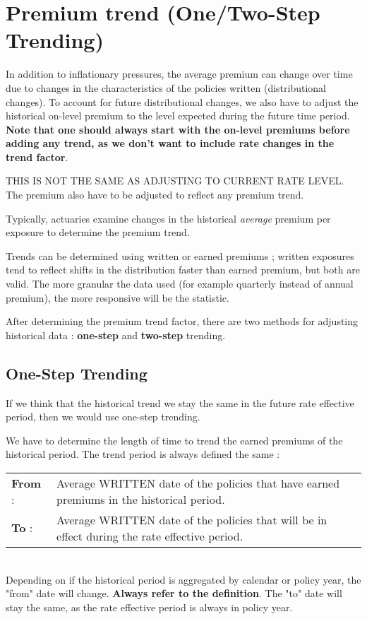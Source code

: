 \documentclass[11pt, english]{memoir}
\numberwithin{definition}{section}
\begin{document}
	\section{Premium trend (One/Two-Step Trending)}
	In addition to inflationary pressures, the average premium can change over time due to changes in the characteristics of the policies written (distributional changes). To account for future distributional changes, we also have to adjust the historical on-level premium to the level expected during the future time period. \textbf{Note that one should always start with the on-level premiums before adding any trend, as we don't want to include rate changes in the trend factor}.
	
	THIS IS NOT THE SAME AS ADJUSTING TO CURRENT RATE LEVEL. The premium also have to be adjusted to reflect any premium trend. 
	
	Typically, actuaries examine changes in the historical \emph{average} premium per exposure to determine the premium trend. 
	
	Trends can be determined using written or earned premiums ; written exposures tend to reflect shifts in the distribution faster than earned premium, but both are valid. The more granular the data used (for example quarterly instead of annual premium), the more responsive will be the statistic. 
	
	After determining the premium trend factor, there are two methods for adjusting historical data : \textbf{one-step} and \textbf{two-step} trending. 
	
	\subsection{One-Step Trending}
	If we think that the historical trend we stay the same in the future rate effective period, then we would use one-step trending. 
	
	We have to determine the length of time to trend the earned premiums of the historical period. The trend period is always defined the same : 
	
	\begin{tcolorbox}
		\begin{tabular}{ll}
			\textbf{From} : & 	\begin{minipage}{0.8\linewidth}
				Average WRITTEN date of the policies that have earned premiums in the historical period.
			\end{minipage}\\[15pt]
			\textbf{To} : & \begin{minipage}{0.8\linewidth}
				Average WRITTEN date of the policies that will be in effect during the rate effective period.
			\end{minipage}\\ 
		\end{tabular}\\
	
		Depending on if the historical period is aggregated by calendar or policy year, the "from" date will change. \textbf{Always refer to the definition}. The "to" date will stay the same, as the rate effective period is always in policy year. 
	\end{tcolorbox}
	
\end{document}
